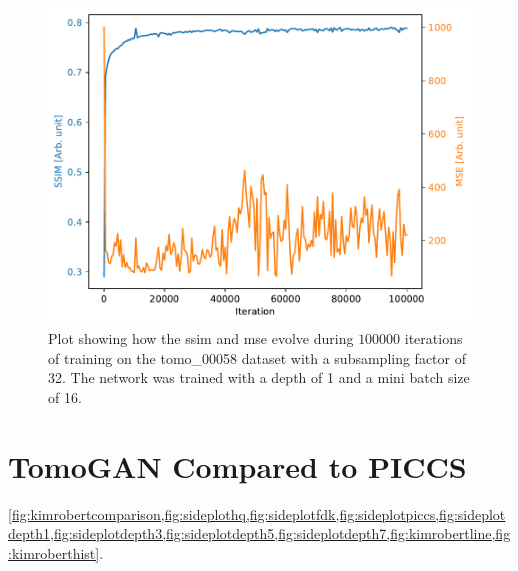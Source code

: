 \begin{figure}[htbp]
  \centering
  \includegraphics[width=.85\textwidth]{figures/ssimns32logcosh.pdf}
  \caption[SSIM and MSE evolution during training]{Plot showing how the \acrshort{ssim} and \acrshort{mse} evolve during $100000$ iterations of training on the tomo\_00058 dataset with a subsampling factor of 32. The network was trained with a depth of 1 and a mini batch size of 16. }
  \label{fig:ssimmseevolution}
\end{figure}


\section{TomoGAN Compared to PICCS}
\cref{fig:kimrobertcomparison,fig:sideplothq,fig:sideplotfdk,fig:sideplotpiccs,fig:sideplotdepth1,fig:sideplotdepth3,fig:sideplotdepth5,fig:sideplotdepth7,fig:kimrobertline,fig:kimroberthist}. 


